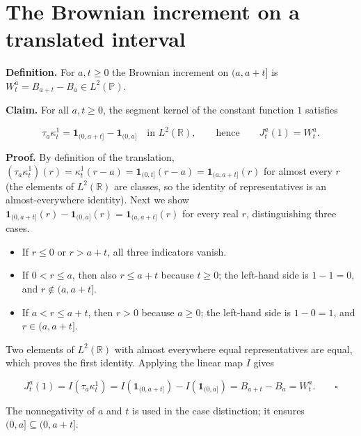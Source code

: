 \documentclass[11pt,a4paper]{article}
\begin{document}
\section{\texorpdfstring{The Brownian increment on a translated interval}{The Brownian increment on a translated interval}}


\textbf{Definition.} For \(a,t\ge0\) the Brownian increment on \((a,a+t]\) is \(W^a_t=B_{a+t}-B_a\in L^2(\mathbb P)\).




\textbf{Claim.} For all \(a,t\ge0\), the segment kernel of the constant function \(1\) satisfies


\[\tau_a\kappa^1_t=\mathbf 1_{(0,a+t]}-\mathbf 1_{(0,a]}\quad\text{in }L^2(\mathbb R),\qquad\text{hence}\qquad J^a_t(1)=W^a_t .\]


\textbf{Proof.} By definition of the translation, \((\tau_a\kappa^1_t)(r)=\kappa^1_t(r-a)=\mathbf 1_{(0,t]}(r-a)=\mathbf 1_{(a,a+t]}(r)\) for almost every \(r\) (the elements of \(L^2(\mathbb R)\) are classes, so the identity of representatives is an almost-everywhere identity). Next we show \(\mathbf 1_{(0,a+t]}(r)-\mathbf 1_{(0,a]}(r)=\mathbf 1_{(a,a+t]}(r)\) for every real \(r\), distinguishing three cases.



\begin{itemize}


\item If \(r\le0\) or \(r>a+t\), all three indicators vanish.

\item If \(0<r\le a\), then also \(r\le a+t\) because \(t\ge0\); the left-hand side is \(1-1=0\), and \(r\notin(a,a+t]\).

\item If \(a<r\le a+t\), then \(r>0\) because \(a\ge0\); the left-hand side is \(1-0=1\), and \(r\in(a,a+t]\).

\end{itemize}



Two elements of \(L^2(\mathbb R)\) with almost everywhere equal representatives are equal, which proves the first identity. Applying the linear map \(I\) gives


\[J^a_t(1)=I(\tau_a\kappa^1_t)=I(\mathbf 1_{(0,a+t]})-I(\mathbf 1_{(0,a]})=B_{a+t}-B_a=W^a_t .\qquad\square\]


The nonnegativity of \(a\) and \(t\) is used in the case distinction; it ensures \((0,a]\subseteq(0,a+t]\).
\end{document}
